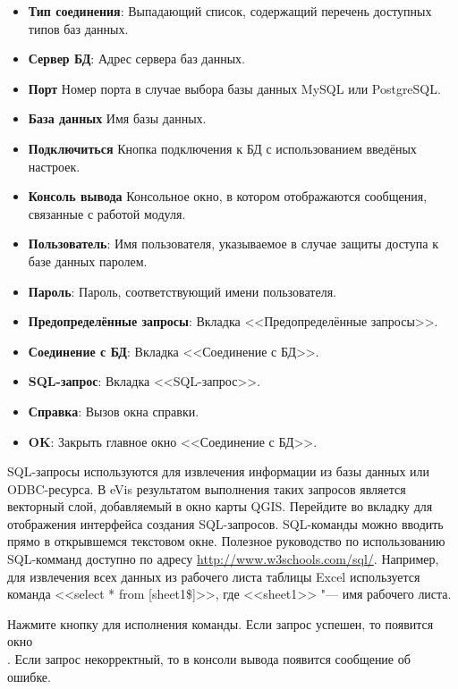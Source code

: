 \begin{itemize}[label=--]
\item \textbf{Тип соединения}: Выпадающий список, содержащий перечень
доступных типов баз данных.
\item \textbf{Сервер БД}: Адрес сервера баз данных.
\item \textbf{Порт} Номер порта в случае выбора базы данных MySQL или
PostgreSQL.
\item \textbf{База данных} Имя базы данных.
\item \textbf{Подключиться} Кнопка подключения к БД с использованием введёных
настроек.
\item \textbf{Консоль вывода} Консольное окно, в котором отображаются
сообщения, связанные с работой модуля.
\item \textbf{Пользователь}: Имя пользователя, указываемое в случае
защиты доступа к базе данных паролем.
\item \textbf{Пароль}: Пароль, соответствующий имени пользователя.
\item \textbf{Предопределённые запросы}: Вкладка <<Предопределённые запросы>>.
\item \textbf{Соединение с БД}: Вкладка <<Соединение с БД>>.
\item \textbf{SQL-запрос}: Вкладка <<SQL-запрос>>.
\item \textbf{Справка}: Вызов окна справки.
\item \textbf{OK}: Закрыть главное окно <<Соединение с БД>>.
\end{itemize}

\label{evis_running_sql}

SQL-запросы используются для извлечения информации из базы данных или
ODBC-ресурса. В eVis результатом выполнения таких запросов является векторный
слой, добавляемый в окно карты QGIS. Перейдите во вкладку 
для отображения интерфейса создания SQL-запросов. SQL-команды можно вводить
прямо в открывшемся текстовом окне. Полезное руководство по использованию
SQL-комманд доступно по адресу \url{http://www.w3schools.com/sql/}. Например,
для извлечения всех данных из рабочего листа таблицы Excel используется
команда <<select * from [sheet1\$]>>, где <<sheet1>> "--- имя рабочего листа.

Нажмите кнопку  для исполнения команды. Если запрос успешен,
то появится окно \\
. Если запрос некорректный, то
в консоли вывода появится сообщение об ошибке.

